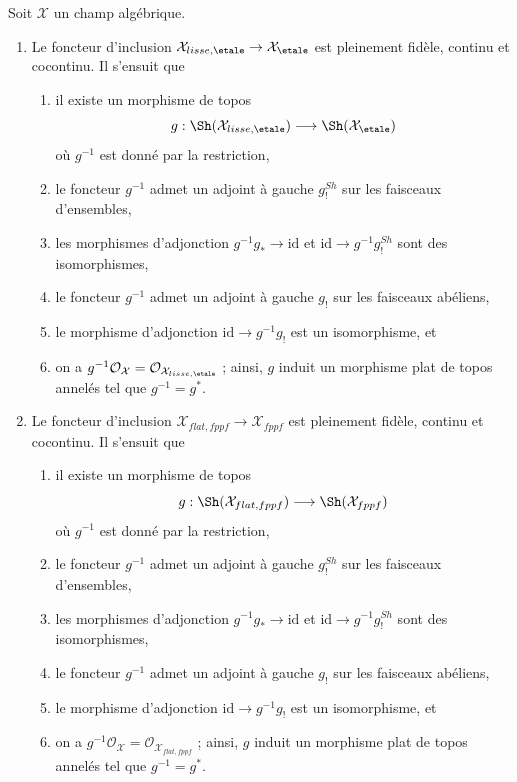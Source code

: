 \begin{lemma}
\label{lemma-lisse-etale}
Soit $\mathcal{X}$ un champ algébrique.
\begin{enumerate}
\item Le foncteur d'inclusion
$\mathcal{X}_{lisse,\etale} \to \mathcal{X}_\etale$
est pleinement fidèle, continu et cocontinu. Il s'ensuit que
\begin{enumerate}
\item il existe un morphisme de topos
$$
g :
\Sh(\mathcal{X}_{lisse,\etale})
\longrightarrow
\Sh(\mathcal{X}_\etale)
$$
où $g^{-1}$ est donné par la restriction,
\item le foncteur $g^{-1}$ admet un adjoint à gauche $g_!^{Sh}$ sur les faisceaux d'ensembles,
\item les morphismes d'adjonction $g^{-1}g_* \to \text{id}$ et
$\text{id} \to g^{-1}g_!^{Sh}$ sont des isomorphismes,
\item le foncteur $g^{-1}$ admet un adjoint à gauche $g_!$ sur les faisceaux abéliens,
\item le morphisme d'adjonction $\text{id} \to g^{-1}g_!$ est un isomorphisme, et
\item on a $g^{-1}\mathcal{O}_\mathcal{X} =
\mathcal{O}_{\mathcal{X}_{lisse,\etale}}$ ; ainsi, $g$ induit un morphisme plat
de topos annelés tel que $g^{-1} = g^*$.
\end{enumerate}
\item Le foncteur d'inclusion
$\mathcal{X}_{flat,fppf} \to \mathcal{X}_{fppf}$
est pleinement fidèle, continu et cocontinu. Il s'ensuit que
\begin{enumerate}
\item il existe un morphisme de topos
$$
g :
\Sh(\mathcal{X}_{flat,fppf})
\longrightarrow
\Sh(\mathcal{X}_{fppf})
$$
où $g^{-1}$ est donné par la restriction,
\item le foncteur $g^{-1}$ admet un adjoint à gauche $g_!^{Sh}$ sur les faisceaux d'ensembles,
\item les morphismes d'adjonction $g^{-1}g_* \to \text{id}$ et
$\text{id} \to g^{-1}g_!^{Sh}$ sont des isomorphismes,
\item le foncteur $g^{-1}$ admet un adjoint à gauche $g_!$ sur les faisceaux abéliens,
\item le morphisme d'adjonction $\text{id} \to g^{-1}g_!$ est un isomorphisme, et
\item on a $g^{-1}\mathcal{O}_\mathcal{X} =
\mathcal{O}_{\mathcal{X}_{flat,fppf}}$ ; ainsi, $g$ induit un morphisme plat
de topos annelés tel que $g^{-1} = g^*$.
\end{enumerate}
\end{enumerate}
\end{lemma}

